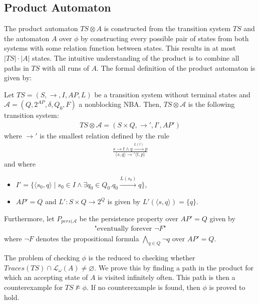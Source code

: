 \subsection{Product Automaton}
\label{sec:product-automaton}
The product automaton $TS \otimes A$ is constructed from the transition system $TS$ and the automaton $A$ over $\phi$ by constructing every possible pair of states from both systems with some relation function between states. This results in at most $|TS|\cdot |A|$ states. The intuitive understanding of the product is to combine all paths in $TS$ with all runs of $A$. The formal definition of the product automaton is given by:
\begin{definition}
Let $TS=\left( S, \longrightarrow, I, AP, L \right)$ be a transition system without terminal states and $\mathcal{A}=\left( Q, 2^{AP}, \delta, Q_0, F \right)$ a nonblocking NBA. Then, $TS \otimes \mathcal{A}$ is the following transition system:
\begin{align*}
    TS \otimes \mathcal{A} = \left( S \times Q, \longrightarrow', I', AP' \right)
\end{align*}
where $\longrightarrow'$ is the smallest relation defined by the rule
\begin{align*}
    \frac{s \longrightarrow t \land q \xrightarrow{L(t)} p}{ \langle s, q \rangle \longrightarrow' \langle t, p \rangle}
\end{align*}
and where
\begin{itemize}
    \item $I' = \{ \langle s_0, q \rangle \mid s_0 \in I \land \exists q_0 \in Q_0 . q_0 \xrightarrow{L(s_0)} q \}$,
    \item $AP' = Q$ and $L' : S \times Q \rightarrow 2^Q$ is given by $L'(\langle s, q \rangle) = \{q\}$.
\end{itemize}
Furthermore, let $P_{pers(\mathcal{A}}$ be the persistence property over $AP' = Q$ given by
\begin{align*}
    \text{"eventually forever $\lnot F$"}
\end{align*}
where $\lnot F$ denotes the propositional formula $\bigwedge\limits_{q \in Q} \lnot q$ over $AP' = Q$.
\end{definition}

The problem of checking $\phi$ is the reduced to checking whether $Traces(TS) \cap \mathcal{L_\omega}(A) \neq \varnothing$. We prove this by finding a path in the product for which an accepting state of $A$ is visited infinitely often. This path is then a counterexample for $TS \not\models \phi$. If no counterexample is found, then $\phi$ is proved to hold.

